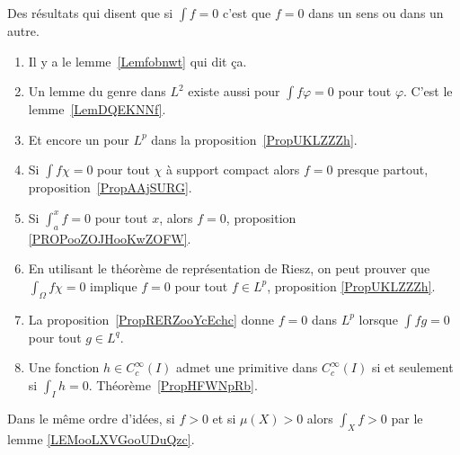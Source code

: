 		\label{THEMEooDASVooWZLOjw}
Des résultats qui disent que si \( \int f=0\) c'est que \( f=0\) dans un sens ou dans un autre.
\begin{enumerate}
	\item
	      Il y a le lemme~\ref{Lemfobnwt} qui dit ça.
	\item
	      Un lemme du genre dans \( L^2\) existe aussi pour \( \int f\varphi=0\) pour tout \( \varphi\). C'est le lemme~\ref{LemDQEKNNf}.
	\item
	      Et encore un pour \( L^p\) dans la proposition~\ref{PropUKLZZZh}.
	\item
	      Si \( \int f\chi=0\) pour tout \( \chi\) à support compact alors \( f=0\) presque partout, proposition~\ref{PropAAjSURG}.
	\item
	      Si \( \int_a^xf=0\) pour tout \( x\), alors \( f=0\), proposition \ref{PROPooZOJHooKwZOFW}.
	\item
	      En utilisant le théorème de représentation de Riesz, on peut prouver que \( \int_{\Omega}f\chi=0\) implique \( f=0\) pour tout \( f\in L^p\), proposition \ref{PropUKLZZZh}.
	\item
	      La proposition~\ref{PropRERZooYcEchc} donne \( f=0\) dans \( L^p\) lorsque \( \int fg=0\) pour tout \( g\in L^q\).
	\item
	      Une fonction \( h\in C^{\infty}_c(I)\) admet une primitive dans \(  C^{\infty}_c(I)\) si et seulement si \( \int_Ih=0\). Théorème~\ref{PropHFWNpRb}.
\end{enumerate}

Dans le même ordre d'idées, si \( f>0\) et si \( \mu(X)>0\) alors \( \int_Xf>0\) par le lemme \ref{LEMooLXVGooUDuQzc}.
